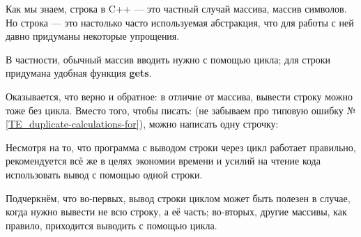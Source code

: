 \begin{typerror}
	\label{TE_string-cout-for}

	Как мы знаем, строка в C++ --- это частный случай массива, массив символов.
	Но строка --- это настолько часто используемая абстракция,
	что для работы с ней давно придуманы некоторые упрощения.

	В частности, обычный массив вводить нужно с помощью цикла;
	для строки придумана удобная функция \textbf{gets}.

	Оказывается, что верно и обратное:
	в отличие от массива, вывести строку можно тоже без цикла.
	Вместо того, чтобы писать:
	(не забываем про типовую ошибку №\ref{TE_duplicate-calculations-for}),
	можно написать одну строчку:

	Несмотря на то, что программа с выводом строки через цикл работает правильно,
	рекомендуется всё же в целях экономии времени и усилий на чтение кода
	использовать вывод с помощью одной строки.

	Подчеркнём, что во-первых,
	вывод строки циклом может быть полезен в случае,
	когда нужно вывести не всю строку, а её часть;
	во-вторых, другие массивы, как правило,
	приходится выводить с помощью цикла.
\end{typerror}
